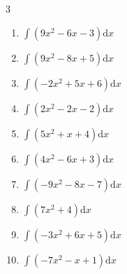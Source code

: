 \begin{multicols}{3}
\begin{enumerate}

\columnbreak %

  \item $\displaystyle \int \left( 9x^{2}-6x-3 \right) \mathrm{d}x$


  \item $\displaystyle \int \left( 9x^{2}-8x+5 \right) \mathrm{d}x$


  \item $\displaystyle \int \left( -2x^{2}+5x+6 \right) \mathrm{d}x$


  \item $\displaystyle \int \left( 2x^{2}-2x-2 \right) \mathrm{d}x$


  \item $\displaystyle \int \left( 5x^{2}+x+4 \right) \mathrm{d}x$


  \item $\displaystyle \int \left( 4x^{2}-6x+3 \right) \mathrm{d}x$


  \item $\displaystyle \int \left( -9x^{2}-8x-7 \right) \mathrm{d}x$


  \item $\displaystyle \int \left( 7x^{2}+4 \right) \mathrm{d}x$


  \item $\displaystyle \int \left( -3x^{2}+6x+5 \right) \mathrm{d}x$


  \item $\displaystyle \int \left( -7x^{2}-x+1 \right) \mathrm{d}x$



\end{enumerate}
\end{multicols}
